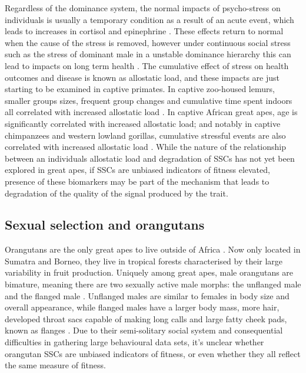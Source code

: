 Regardless of the dominance system, the normal impacts of psycho-stress on individuals is usually a temporary condition as a result of an acute event, which leads to increases in cortisol and epinephrine \citep{Edes.2017}. These effects return to normal when the cause of the stress is removed, however under continuous social stress such as the stress of dominant male in a unstable dominance hierarchy this can lead to impacts on long term health \citep{Maestripieri.2011}. The cumulative effect of stress on health outcomes and disease is known as allostatic load, and these impacts are just starting to be examined in captive primates. In captive zoo-housed lemurs, smaller groups sizes, frequent group changes and cumulative time spent indoors all correlated with increased allostatic load \citep{Seeley.2021gr8}. In captive African great apes, age is significantly correlated with increased allostatic load; and notably in captive chimpanzees and western lowland gorillas, cumulative stressful events are also correlated with increased allostatic load \citep{Edes.2016,Edes.2023}. While the nature of the relationship between an individuals allostatic load and degradation of SSCs has not yet been explored in great apes, if SSCs are unbiased indicators of fitness elevated, presence of these biomarkers may be part of the mechanism that leads to degradation of the quality of the signal produced by the trait.


\subsection{Sexual selection and orangutans}

Orangutans are the only great apes to live outside of Africa \citep{Wich.2008}. Now only located in Sumatra and Borneo, they live in tropical forests characterised by their large variability in fruit production. Uniquely among great apes, male orangutans are bimature, meaning there are two sexually active male morphs: the unflanged male and the flanged male \citep{Prasetyo.2021}. Unflanged males are similar to females in body size and overall appearance, while flanged males have a larger body mass, more hair, developed throat sacs capable of making long calls and large fatty cheek pads, known as flanges \citep{Knott.2008}. Due to their semi-solitary social system and consequential difficulties in gathering large behavioural data sets, it's unclear whether orangutan SSCs are unbiased indicators of fitness, or even whether they all reflect the same measure of fitness. 

